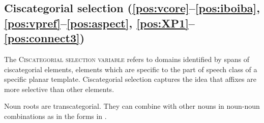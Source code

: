 \documentclass[output=paper,hidelinks]{langscibook}
\begin{document}




\subsection{Ciscategorial selection (\ref{pos:vcore}--\ref{pos:iboiba}, \ref{pos:vpref}--\ref{pos:aspect}, \ref{pos:XP1}--\ref{pos:connect3})}
\label{sec:selection}

The \textsc{Ciscategorial selection variable} refers to domains identified by spans of ciscategorial elements, elements which are specific to the part of speech class of a specific planar template. Ciscategorial selection captures the idea that affixes are more selective than other elements.

Noun roots are transcategorial. They can combine with other nouns in noun-noun combinations as in the forms in .
\end{document}
